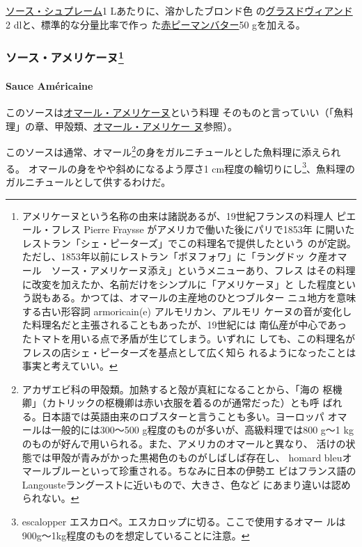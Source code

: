 \begin{recette}
\protect\hyperlink{sauce-supreme}{ソース・シュプレーム}1
Lあたりに、溶かしたブロンド色
の\protect\hyperlink{glace-de-viande}{グラスドヴィアンド}2
dlと、標準的な分量比率で作っ た\href{}{赤ピーマンバター}50 gを加える。

\maeaki

\hypertarget{ux30bdux30fcux30b9ux30a2ux30e1ux30eaux30b1ux30fcux30cc3}{%
\subsubsection[ソース・アメリケーヌ]{\texorpdfstring{ソース・アメリケーヌ\footnote{アメリケーヌという名称の由来は諸説あるが、19世紀フランスの料理人
  ピエール・フレス Pierre Fraysse がアメリカで働いた後にパリで1853年
  に開いたレストラン「シェ・ピーターズ」でこの料理名で提供したという
  のが定説。ただし、1853年以前にレストラン「ボヌフォワ」に「ラングドッ
  ク産オマール　ソース・アメリケーヌ添え」というメニューあり、フレス
  はその料理に改変を加えたか、名前だけをシンプルに「アメリケーヌ」と
  した程度という説もある。かつては、オマールの主産地のひとつブルター
  ニュ地方を意味する古い形容詞 armoricain(e) アルモリカン、アルモリ
  ケーヌの音が変化した料理名だと主張されることもあったが、19世紀には
  南仏産が中心であったトマトを用いる点で矛盾が生じてしまう。いずれに
  しても、この料理名がフレスの店シェ・ピーターズを基点として広く知ら
  れるようになったことは事実と考えていい。}}{ソース・アメリケーヌ}}\label{ux30bdux30fcux30b9ux30a2ux30e1ux30eaux30b1ux30fcux30cc3}}

\hypertarget{sauce-americaine}{%
\paragraph{Sauce Américaine}\label{sauce-americaine}}


このソースは\protect\hyperlink{homard-a-l-americaine}{オマール・アメリケーヌ}という料理
そのものと言っていい（「魚料理」の章、甲殻類、\protect\hyperlink{homard-a-l-americaine}{オマール・アメリケー
ヌ}参照）。

このソースは通常、オマール\footnote{アカザエビ科の甲殻類。加熱すると殻が真紅になることから、「海の
  枢機卿」（カトリックの枢機卿は赤い衣服を着るのが通常だった）とも呼
  ばれる。日本語では英語由来のロブスターと言うことも多い。ヨーロッパ
  オマールは一般的には300〜500 g程度のものが多いが、高級料理では800 g〜1
  kgのものが好んで用いられる。また、アメリカのオマールと異なり、
  活けの状態では甲殻が青みがかった黒褐色のものがしばしば存在し、 homard
  bleuオマールブルーといって珍重される。ちなみに日本の伊勢エ
  ビはフランス語のLangousteラングーストに近いもので、大きさ、色など
  にあまり違いは認められない。}の身をガルニチュールとした魚料理に添えられる。
オマールの身をやや斜めになるよう厚さ1 cm程度の輪切りにし\footnote{escalopper
  エスカロペ。エスカロップに切る。ここで使用するオマー
  ルは900g〜1kg程度のものを想定していることに注意。}、魚料理の
ガルニチュールとして供するわけだ。


\end{recette}
